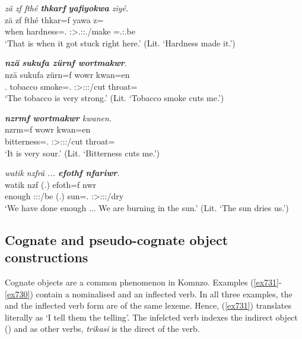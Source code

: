 \begin{exe}
	\ex \emph{zä zf fthé \textbf{thkarf} \textbf{yafiyokwa} ziyé.}\\
	\gll zä zf fthé thkar=f yawa z=\\
	\Prox{} \Imm{} when hardness=\Erg.\Sg{} \Stsg{}:\Sbj>\Tsg{}.\Masc{}:\Obj{}:\Pst.\Ipfv{}/make \Prox{}=\Tsg{}.\Masc{}:\Nonpast{}.be\\
	\trans `That is when it got stuck right here.' (Lit. `Hardness made it.')\\
	\label{ex584}
\end{exe}
\begin{exe}
	\ex \emph{\textbf{nzä} \textbf{sukufa zürnf wortmakwr}.}\\
	\gll nzä sukufa zürn=f wowr kwan=en\\
	\Fsg.\Abs{} tobacco smoke=\Erg.\Sg{} \Stsg:\Sbj>\Fsg:\Obj:\Nonpast:\Ipfv/cut throat=\Loc{}\\
	\trans `The tobacco is very strong.' (Lit. `Tobacco smoke cuts me.')
	\label{ex585}
\end{exe}
\begin{exe}
	\ex \emph{\textbf{nzrmf wortmakwr} kwanen.}\\
	\gll nzrm=f wowr kwan=en\\
	bitterness=\Erg.\Sg{} \Stsg:\Sbj>\Fsg:\Obj:\Nonpast:\Ipfv/cut throat=\Loc{}\\
	\trans `It is very sour.' (Lit. `Bitterness cuts me.')
	\label{ex586}
\end{exe}
\begin{exe}
	\ex \emph{watik nzfrä ... \textbf{efothf nfariwr}.}\\
	\gll watik nzf (.) efoth=f nwr\\
	enough \Fpl:\Sbj:\Rpst:\Ipfv/be (.) sun=\Erg.\Sg{} \Stsg:\Sbj>\Fpl:\Obj:\Nonpast:\Ipfv/dry\\
	\trans `We have done enough ... We are burning in the sun.' (Lit. `The sun dries us.')
	\label{ex587}
\end{exe}

\subsection{Cognate and pseudo-cognate object constructions}\label{pseudocognate}

Cognate objects are a common phenomenon in Komnzo. Examples (\ref{ex731}-\ref{ex730}) contain a nominalised  and an inflected verb. In all three examples, the  and the inflected verb form are of the same lexeme. Hence, (\ref{ex731}) translates literally as `I tell them the telling'. The infelcted verb indexes the indirect object (\Stpl) and as other  verbs, \emph{trikasi} is the direct  of the verb.

